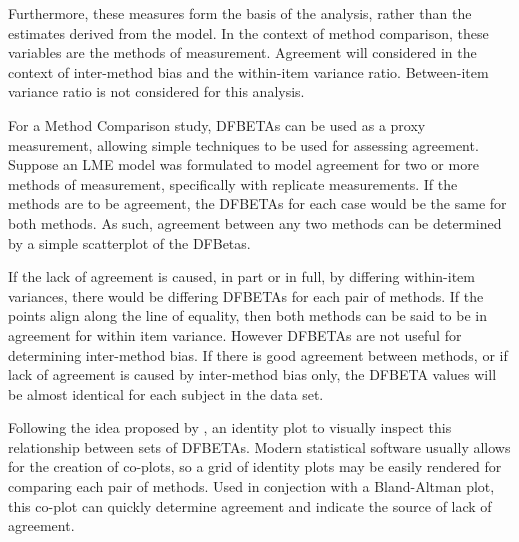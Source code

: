 \documentclass[12pt, a4paper]{report}
\theoremstyle{plain}
\theoremstyle{definition}
\theoremstyle{remark}
\begin{document}
	Furthermore, these measures form the basis of the analysis, rather than the estimates derived from the model. In the context of method comparison, these variables are the methods of measurement.
	Agreement will considered in the context of inter-method bias and the within-item variance ratio. Between-item variance ratio is not considered for this analysis.
	
	For a Method Comparison study, DFBETAs can be used as a proxy measurement, allowing simple techniques to be used for assessing agreement. Suppose an LME model was formulated to model agreement for two or more methods of measurement, specifically with replicate measurements. If the methods are to be agreement, the DFBETAs for each case would be the same for both methods. As such, agreement between any two methods can be determined by a simple scatterplot of the DFBetas. 
	
	
	If the lack of agreement is caused, in part or in full, by differing within-item variances, there would be differing DFBETAs for each pair of methods. If the points align along the line of equality, then both methods can be said to be in agreement for within item variance. However DFBETAs are not useful for determining inter-method bias. If there is good agreement between methods, or if lack of agreement is caused by inter-method bias only, the DFBETA values will be almost identical for each subject in the data set. 
	
	Following the idea proposed by \citet{BA86}, an identity plot to visually inspect this relationship between sets of DFBETAs. Modern statistical software usually allows for the creation of co-plots, so a grid of identity plots may be easily rendered for comparing each pair of methods. Used in conjection with a Bland-Altman plot, this co-plot can quickly determine agreement and indicate the source of lack of agreement.
	
\end{document}
